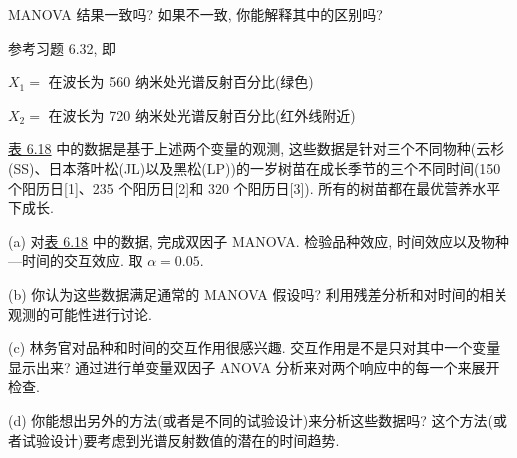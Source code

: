 
MANOVA 结果一致吗? 如果不一致, 你能解释其中的区别吗?

\quad 参考习题 6.32, 即

\noindent $X_1=$ 在波长为 560 纳米处光谱反射百分比(绿色)

\noindent $X_2=$ 在波长为 720 纳米处光谱反射百分比(红外线附近)

\hyperref[tab:6.18]{表 6.18} 中的数据是基于上述两个变量的观测, 这些数据是针对三个不同物种(云杉(SS)、日本落叶松(JL)以及黑松(LP))的一岁树苗在成长季节的三个不同时间(150 个阳历日[1]、235 个阳历日[2]和 320 个阳历日[3]). 所有的树苗都在最优营养水平下成长.

\noindent (a) 对\hyperref[tab:6.18]{表 6.18} 中的数据, 完成双因子 MANOVA. 检验品种效应, 时间效应以及物种—时间的交互效应. 取 $\alpha=0.05$.

\noindent (b) 你认为这些数据满足通常的 MANOVA 假设吗? 利用残差分析和对时间的相关观测的可能性进行讨论.

\noindent (c) 林务官对品种和时间的交互作用很感兴趣. 交互作用是不是只对其中一个变量显示出来? 通过进行单变量双因子 ANOVA 分析来对两个响应中的每一个来展开检查.

\noindent (d) 你能想出另外的方法(或者是不同的试验设计)来分析这些数据吗? 这个方法(或者试验设计)要考虑到光谱反射数值的潜在的时间趋势.

